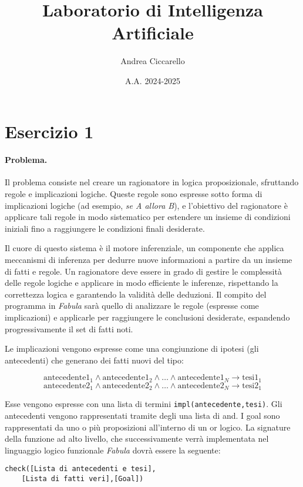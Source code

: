 \documentclass[12pt,twoside]{report}
\title{Laboratorio di Intelligenza Artificiale}
\author{Andrea Ciccarello}
\date{A.A. 2024-2025}
\begin{document}
\maketitle

\section*{Esercizio 1}

\paragraph{Problema.} Il problema consiste nel creare un ragionatore in logica proposizionale, sfruttando regole e implicazioni logiche. Queste regole sono espresse sotto forma di implicazioni logiche (ad esempio, \emph{se A allora B}), e l'obiettivo del ragionatore è applicare tali regole in modo sistematico per estendere un insieme di condizioni iniziali fino a raggiungere le condizioni finali desiderate.

Il cuore di questo sistema è il motore inferenziale, un componente che applica meccanismi di inferenza per dedurre nuove informazioni a partire da un insieme di fatti e regole.
Un ragionatore deve essere in grado di gestire le complessità delle regole logiche e applicare in modo efficiente le inferenze, rispettando la correttezza logica e garantendo la validità delle deduzioni.
Il compito del programma in \textit{Fabula} sarà quello di analizzare le regole (espresse come implicazioni) e applicarle per raggiungere le conclusioni desiderate, espandendo progressivamente il set di fatti noti. 

Le implicazioni vengono espresse come una congiunzione di ipotesi (gli antecedenti) che generano dei fatti nuovi del tipo:

\[
\text{antecedente1}_1 \land \text{antecedente1}_2 \land \ldots \land \text{antecedente1}_N \rightarrow \text{tesi1}_1
\]
\[
\text{antecedente2}_1 \land \text{antecedente2}_2 \land \ldots \land \text{antecedente2}_N \rightarrow \text{tesi2}_1
\]

Esse vengono espresse con una lista di termini \texttt{impl(antecedente,tesi)}. Gli antecedenti vengono rappresentati tramite degli una lista di and. I goal sono rappresentati da uno o più proposizioni all'interno di un or logico.
La signature della funzione ad alto livello, che successivamente verrà implementata nel linguaggio logico funzionale \textit{Fabula} dovrà essere la seguente:

\begin{lstlisting}
check([Lista di antecedenti e tesi], 
    [Lista di fatti veri],[Goal])
\end{lstlisting}
\end{document}
